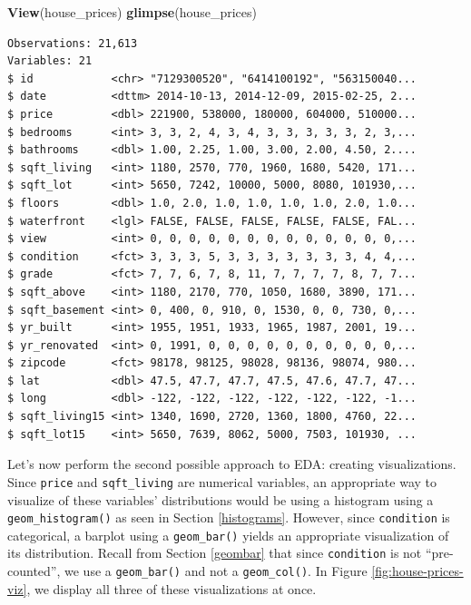 \documentclass[12pt,]{krantz}
\makeatletter
\newenvironment{Shaded}{\begin{snugshade}}{\end{snugshade}}
\newcommand{\KeywordTok}[1]{\textcolor[rgb]{0.27,0.27,0.27}{\textbf{#1}}}
\newcommand{\NormalTok}[1]{#1}
\newenvironment{kframe}{%
\medskip{}
\setlength{\fboxsep}{.8em}
 \def\at@end@of@kframe{}%
 \ifinner\ifhmode%
  \def\at@end@of@kframe{\end{minipage}}%
  \begin{minipage}{\columnwidth}%
 \fi\fi%
 \def\FrameCommand##1{\hskip\@totalleftmargin \hskip-\fboxsep
 \colorbox{shadecolor}{##1}\hskip-\fboxsep
     \hskip-\linewidth \hskip-\@totalleftmargin \hskip\columnwidth}%
 \MakeFramed {\advance\hsize-\width
   \@totalleftmargin\z@ \linewidth\hsize
   \@setminipage}}%
 {\par\unskip\endMakeFramed%
 \at@end@of@kframe}
\renewenvironment{Shaded}{\begin{kframe}}{\end{kframe}}
\theoremstyle{definition}
\theoremstyle{definition}
\theoremstyle{definition}
\theoremstyle{remark}
\makeatother
\begin{document}
\begin{Shaded}
\begin{Highlighting}[]
\KeywordTok{View}\NormalTok{(house_prices)}
\KeywordTok{glimpse}\NormalTok{(house_prices)}
\end{Highlighting}
\end{Shaded}

\begin{verbatim}
Observations: 21,613
Variables: 21
$ id            <chr> "7129300520", "6414100192", "563150040...
$ date          <dttm> 2014-10-13, 2014-12-09, 2015-02-25, 2...
$ price         <dbl> 221900, 538000, 180000, 604000, 510000...
$ bedrooms      <int> 3, 3, 2, 4, 3, 4, 3, 3, 3, 3, 3, 2, 3,...
$ bathrooms     <dbl> 1.00, 2.25, 1.00, 3.00, 2.00, 4.50, 2....
$ sqft_living   <int> 1180, 2570, 770, 1960, 1680, 5420, 171...
$ sqft_lot      <int> 5650, 7242, 10000, 5000, 8080, 101930,...
$ floors        <dbl> 1.0, 2.0, 1.0, 1.0, 1.0, 1.0, 2.0, 1.0...
$ waterfront    <lgl> FALSE, FALSE, FALSE, FALSE, FALSE, FAL...
$ view          <int> 0, 0, 0, 0, 0, 0, 0, 0, 0, 0, 0, 0, 0,...
$ condition     <fct> 3, 3, 3, 5, 3, 3, 3, 3, 3, 3, 3, 4, 4,...
$ grade         <fct> 7, 7, 6, 7, 8, 11, 7, 7, 7, 7, 8, 7, 7...
$ sqft_above    <int> 1180, 2170, 770, 1050, 1680, 3890, 171...
$ sqft_basement <int> 0, 400, 0, 910, 0, 1530, 0, 0, 730, 0,...
$ yr_built      <int> 1955, 1951, 1933, 1965, 1987, 2001, 19...
$ yr_renovated  <int> 0, 1991, 0, 0, 0, 0, 0, 0, 0, 0, 0, 0,...
$ zipcode       <fct> 98178, 98125, 98028, 98136, 98074, 980...
$ lat           <dbl> 47.5, 47.7, 47.7, 47.5, 47.6, 47.7, 47...
$ long          <dbl> -122, -122, -122, -122, -122, -122, -1...
$ sqft_living15 <int> 1340, 1690, 2720, 1360, 1800, 4760, 22...
$ sqft_lot15    <int> 5650, 7639, 8062, 5000, 7503, 101930, ...
\end{verbatim}

Let's now perform the second possible approach to EDA: creating
visualizations. Since \texttt{price} and \texttt{sqft\_living} are
numerical variables, an appropriate way to visualize of these variables'
distributions would be using a histogram using a
\texttt{geom\_histogram()} as seen in Section \ref{histograms}. However,
since \texttt{condition} is categorical, a barplot using a
\texttt{geom\_bar()} yields an appropriate visualization of its
distribution. Recall from Section \ref{geombar} that since
\texttt{condition} is not ``pre-counted'', we use a \texttt{geom\_bar()}
and not a \texttt{geom\_col()}. In Figure \ref{fig:house-prices-viz}, we
display all three of these visualizations at once.
\end{document}
